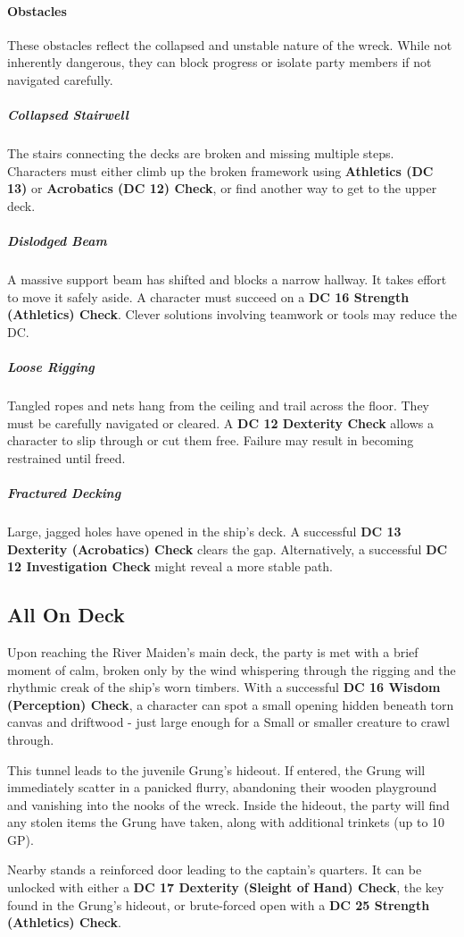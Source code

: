 {\entryfont \paragraph*{Obstacles} These obstacles reflect the collapsed and unstable nature of the wreck. While not inherently dangerous, they can block progress or isolate party members if not navigated carefully.
\subparagraph*{Collapsed Stairwell} The stairs connecting the decks are broken and missing multiple steps. Characters must either climb up the broken framework using \textbf{Athletics (DC 13)} or \textbf{Acrobatics (DC 12) Check}, or find another way to get to the upper deck.
\subparagraph*{Dislodged Beam} A massive support beam has shifted and blocks a narrow hallway. It takes effort to move it safely aside. A character must succeed on a \textbf{DC 16 Strength (Athletics) Check}. Clever solutions involving teamwork or tools may reduce the DC.
\subparagraph*{Loose Rigging} Tangled ropes and nets hang from the ceiling and trail across the floor. They must be carefully navigated or cleared. A \textbf{DC 12 Dexterity Check} allows a character to slip through or cut them free. Failure may result in becoming restrained until freed.
\subparagraph*{Fractured Decking} Large, jagged holes have opened in the ship's deck. A successful \textbf{DC 13 Dexterity (Acrobatics) Check} clears the gap. Alternatively, a successful \textbf{DC 12 Investigation Check} might reveal a more stable path.
}

\subsection*{All On Deck}
{\entryfont Upon reaching the River Maiden's main deck, the party is met with a brief moment of calm, broken only by the wind whispering through the rigging and the rhythmic creak of the ship's worn timbers. With a successful \textbf{DC 16 Wisdom (Perception) Check}, a character can spot a small opening hidden beneath torn canvas and driftwood - just large enough for a Small or smaller creature to crawl through.

This tunnel leads to the juvenile Grung's hideout. If entered, the Grung will immediately scatter in a panicked flurry, abandoning their wooden playground and vanishing into the nooks of the wreck. Inside the hideout, the party will find any stolen items the Grung have taken, along with additional trinkets (up to 10 GP).

Nearby stands a reinforced door leading to the captain's quarters. It can be unlocked with either a \textbf{DC 17 Dexterity (Sleight of Hand) Check}, the key found in the Grung's hideout, or brute-forced open with a \textbf{DC 25 Strength (Athletics) Check}.}

